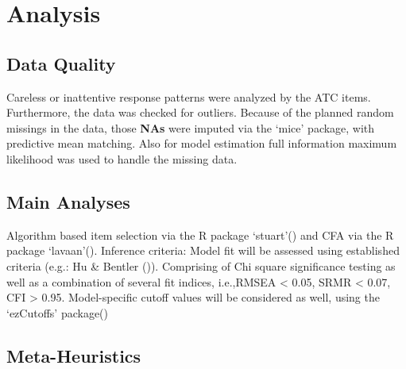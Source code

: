 \documentclass[
  12pt,
  a4paper,
  twoside]{article}
\begin{document}
\section{Analysis}\label{analysis}

\subsection{Data Quality}\label{data-quality}

Careless or inattentive response patterns were analyzed by the ATC items. Furthermore, the data was checked for outliers. Because of the planned random missings in the data, those \textbf{NAs} were imputed via the `mice' package, with predictive mean matching. Also for model estimation full information maximum likelihood was used to handle the missing data.

\subsection{Main Analyses}\label{main-analyses}

Algorithm based item selection via the R package `stuart'() and CFA via the R package `lavaan'(). Inference criteria: Model fit will be assessed using established criteria (e.g.: Hu \& Bentler ()). Comprising of Chi square significance testing as well as a combination of several fit indices, i.e.,RMSEA \textless{} 0.05, SRMR \textless{} 0.07, CFI \textgreater{} 0.95. Model-specific cutoff values will be considered as well, using the `ezCutoffs' package()

\subsection{Meta-Heuristics}\label{meta-heuristics}
\end{document}
